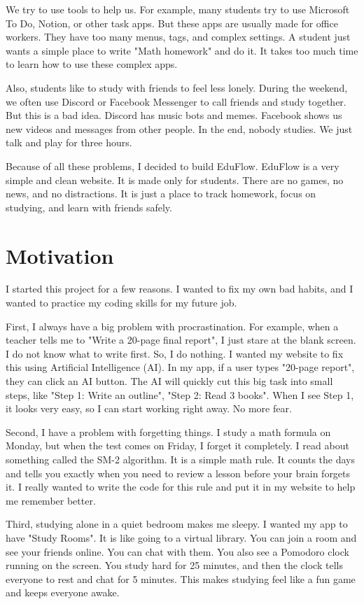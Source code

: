 \documentclass[12pt,a4paper]{report}
\begin{document}
We try to use tools to help us. For example, many students try to use Microsoft To Do, Notion, or other task apps. But these apps are usually made for office workers. They have too many menus, tags, and complex settings. A student just wants a simple place to write "Math homework" and do it. It takes too much time to learn how to use these complex apps.

Also, students like to study with friends to feel less lonely. During the weekend, we often use Discord or Facebook Messenger to call friends and study together. But this is a bad idea. Discord has music bots and memes. Facebook shows us new videos and messages from other people. In the end, nobody studies. We just talk and play for three hours.

Because of all these problems, I decided to build EduFlow. EduFlow is a very simple and clean website. It is made only for students. There are no games, no news, and no distractions. It is just a place to track homework, focus on studying, and learn with friends safely.

\section{Motivation}
I started this project for a few reasons. I wanted to fix my own bad habits, and I wanted to practice my coding skills for my future job.

First, I always have a big problem with procrastination. For example, when a teacher tells me to "Write a 20-page final report", I just stare at the blank screen. I do not know what to write first. So, I do nothing. I wanted my website to fix this using Artificial Intelligence (AI). In my app, if a user types "20-page report", they can click an AI button. The AI will quickly cut this big task into small steps, like "Step 1: Write an outline", "Step 2: Read 3 books". When I see Step 1, it looks very easy, so I can start working right away. No more fear.

Second, I have a problem with forgetting things. I study a math formula on Monday, but when the test comes on Friday, I forget it completely. I read about something called the SM-2 algorithm. It is a simple math rule. It counts the days and tells you exactly when you need to review a lesson before your brain forgets it. I really wanted to write the code for this rule and put it in my website to help me remember better.

Third, studying alone in a quiet bedroom makes me sleepy. I wanted my app to have "Study Rooms". It is like going to a virtual library. You can join a room and see your friends online. You can chat with them. You also see a Pomodoro clock running on the screen. You study hard for 25 minutes, and then the clock tells everyone to rest and chat for 5 minutes. This makes studying feel like a fun game and keeps everyone awake.
\end{document}
